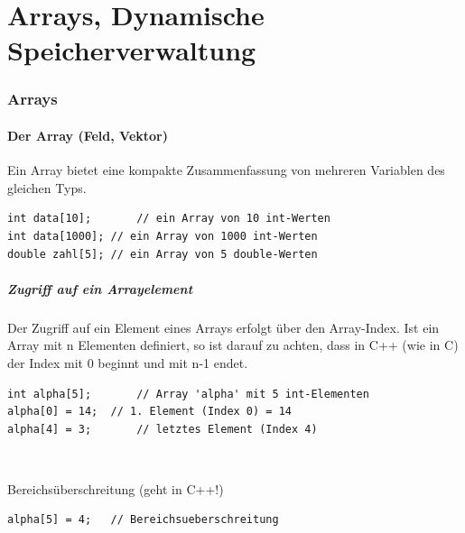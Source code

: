 
\part{Arrays, Dynamische Speicherverwaltung}

\section{Arrays}

\subsection{Der Array (Feld, Vektor)}
\begin{minipage}{0.35\linewidth}
Ein Array bietet eine kompakte Zusammenfassung von mehreren Variablen des gleichen Typs.
\end{minipage}
\hspace{0.01\linewidth}
\begin{minipage}{0.6\linewidth}
\begin{lstlisting}
int data[10];		// ein Array von 10 int-Werten
int data[1000];	// ein Array von 1000 int-Werten
double zahl[5];	// ein Array von 5 double-Werten
\end{lstlisting}
\end{minipage}

\subsubsection{Zugriff auf ein Arrayelement}
\begin{hinweis}
Der Zugriff auf ein Element eines Arrays erfolgt über den Array-Index. Ist ein Array mit n Elementen definiert, so ist darauf zu achten, dass in C++ (wie in C) der Index mit 0 beginnt und mit n-1 endet.
\end{hinweis}
\begin{minipage}{0.65\linewidth}
\vspace{-\baselineskip}
\begin{lstlisting}
int alpha[5];		// Array 'alpha' mit 5 int-Elementen 
alpha[0] = 14;	// 1. Element (Index 0) = 14
alpha[4] = 3;		// letztes Element (Index 4)
\end{lstlisting}
\end{minipage}\\
\begin{achtung}
Bereichsüberschreitung (geht in C++!)
\end{achtung}
\begin{minipage}{0.5\linewidth}
\vspace{-\baselineskip}
\begin{lstlisting}
alpha[5] = 4;	// Bereichsueberschreitung
\end{lstlisting}
\end{minipage}

